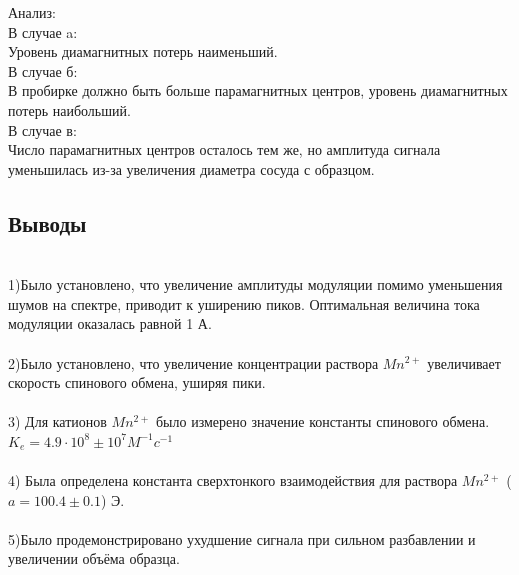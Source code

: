\documentclass[a4paper,12pt]{article}
\theoremstyle{plain} %
\theoremstyle{definition} %
\theoremstyle{remark} %
\begin{document}
Анализ:
\\
В случае a:\\
Уровень диамагнитных потерь наименьший.
\\В случае б:
\\ В пробирке должно быть больше парамагнитных центров, уровень диамагнитных 
потерь наибольший.
\\В случае в:
\\Число парамагнитных центров осталось тем
же, но амплитуда сигнала уменьшилась из-за увеличения диаметра
сосуда с образцом.

\newpage
\setcounter{page}{14}
\subsection{Выводы}
$\text{}$
\\1)Было установлено, что увеличение амплитуды модуляции помимо уменьшения
шумов на спектре, приводит к уширению пиков. Оптимальная
величина тока модуляции оказалась равной 1 А.
\\ \\
2)Было установлено, что увеличение концентрации раствора $Mn^{2+}$
увеличивает скорость спинового обмена, уширяя пики.\\\\
3) Для катионов $Mn^{2+}$ было измерено значение константы спинового обмена. $K_e = 4.9\cdot 10^8 \pm 10^7 M^{-1}c^{-1} $ 
\\\\4)
Была определена константа сверхтонкого взаимодействия для раствора $Mn^{2+}$ ($a = 100.4 \pm 0.1$) Э.
\\\\5)Было продемонстрировано ухудшение сигнала при сильном разбавлении
и увеличении объёма образца.
\end{document}
